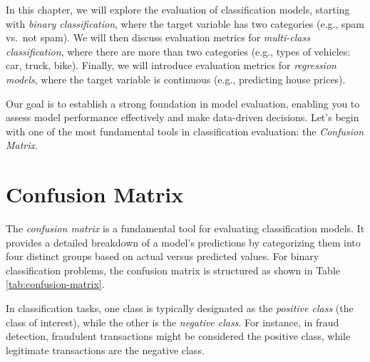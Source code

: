 \documentclass[
]{book}
\theoremstyle{definition}
\theoremstyle{definition}
\theoremstyle{definition}
\theoremstyle{definition}
\theoremstyle{remark}
\begin{document}
In this chapter, we will explore the evaluation of classification models, starting with \emph{binary classification}, where the target variable has two categories (e.g., spam vs.~not spam). We will then discuss evaluation metrics for \emph{multi-class classification}, where there are more than two categories (e.g., types of vehicles: car, truck, bike). Finally, we will introduce evaluation metrics for \emph{regression models}, where the target variable is continuous (e.g., predicting house prices).

Our goal is to establish a strong foundation in model evaluation, enabling you to assess model performance effectively and make data-driven decisions. Let's begin with one of the most fundamental tools in classification evaluation: the \emph{Confusion Matrix}.

\section{Confusion Matrix}\label{confusion-matrix}

The \emph{confusion matrix} is a fundamental tool for evaluating classification models. It provides a detailed breakdown of a model's predictions by categorizing them into four distinct groups based on actual versus predicted values. For binary classification problems, the confusion matrix is structured as shown in Table \ref{tab:confusion-matrix}.

In classification tasks, one class is typically designated as the \emph{positive class} (the class of interest), while the other is the \emph{negative class}. For instance, in fraud detection, fraudulent transactions might be considered the positive class, while legitimate transactions are the negative class.
\end{document}
